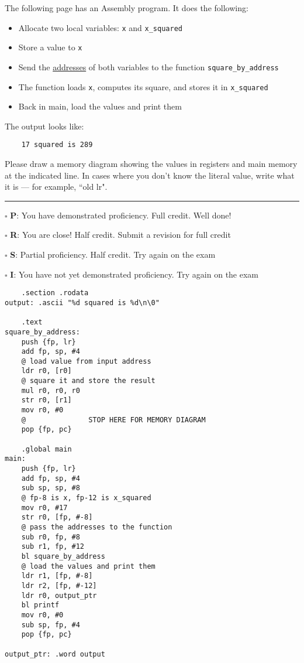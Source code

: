 \documentclass[12pt]{article}
\begin{document}
The following page has an Assembly program. It does the following:
\begin{itemize}
    \item Allocate two local variables: \texttt{x} and \texttt{x\_squared}
    \item Store a value to \texttt{x}
    \item Send the \underline{addresses} of both variables to the function \texttt{square\_by\_address}
    \item The function loads \texttt{x}, computes its square, and stores it in \texttt{x\_squared}
    \item Back in main, load the values and print them
\end{itemize}

The output looks like:
\begin{verbatim}
    17 squared is 289
\end{verbatim}

Please draw a memory diagram showing the values in registers and main memory at the indicated line. In cases where you don't know the literal value, write what it is --- for example, ``old lr". 

\vfill

\rule[1ex]{\textwidth}{.1pt}

$\square$ \textbf{P}: You have demonstrated proficiency. Full credit. Well done!

$\square$ \textbf{R}: You are close! Half credit. Submit a revision for full credit

$\square$ \textbf{S}: Partial proficiency. Half credit. Try again on the exam

$\square$ \textbf{I}: You have not yet demonstrated proficiency. Try again on the exam

\newpage

\begin{verbatim}
    .section .rodata
output: .ascii "%d squared is %d\n\0"

    .text
square_by_address:
    push {fp, lr}
    add fp, sp, #4
    @ load value from input address
    ldr r0, [r0]
    @ square it and store the result
    mul r0, r0, r0
    str r0, [r1]
    mov r0, #0
    @               STOP HERE FOR MEMORY DIAGRAM
    pop {fp, pc}

    .global main
main: 
    push {fp, lr}
    add fp, sp, #4
    sub sp, sp, #8
    @ fp-8 is x, fp-12 is x_squared
    mov r0, #17
    str r0, [fp, #-8]
    @ pass the addresses to the function
    sub r0, fp, #8
    sub r1, fp, #12
    bl square_by_address
    @ load the values and print them
    ldr r1, [fp, #-8]
    ldr r2, [fp, #-12]
    ldr r0, output_ptr
    bl printf
    mov r0, #0
    sub sp, fp, #4
    pop {fp, pc}

output_ptr: .word output
\end{verbatim}
\end{document}
